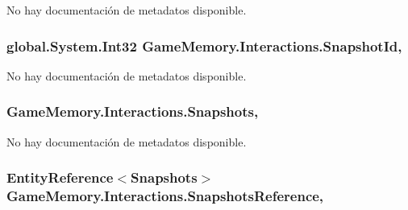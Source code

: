 No hay documentación de metadatos disponible. 

\hypertarget{class_game_memory_1_1_interactions_a59c14fd2a2ca950b68bed7cfb6f34204}{
\subsubsection[{Snapshot\-Id}]{\setlength{\rightskip}{0pt plus 5cm}global.\-System.\-Int32 Game\-Memory.\-Interactions.\-Snapshot\-Id\hspace{0.3cm}{\ttfamily [get]}, {\ttfamily [set]}}}\label{class_game_memory_1_1_interactions_a59c14fd2a2ca950b68bed7cfb6f34204}


No hay documentación de metadatos disponible. 

\hypertarget{class_game_memory_1_1_interactions_ae86dcc6c95cb31539a33d54cefe4f88d}{
\subsubsection[{Snapshots}]{ Game\-Memory.\-Interactions.\-Snapshots\hspace{0.3cm}{\ttfamily [get]}, {\ttfamily [set]}}}\label{class_game_memory_1_1_interactions_ae86dcc6c95cb31539a33d54cefe4f88d}


No hay documentación de metadatos disponible. 

\hypertarget{class_game_memory_1_1_interactions_a88dffca5092152fbe3917d1e3021a786}{
\subsubsection[{Snapshots\-Reference}]{\setlength{\rightskip}{0pt plus 5cm}Entity\-Reference$<${\bf Snapshots}$>$ Game\-Memory.\-Interactions.\-Snapshots\-Reference\hspace{0.3cm}{\ttfamily [get]}, {\ttfamily [set]}}}\label{class_game_memory_1_1_interactions_a88dffca5092152fbe3917d1e3021a786}



